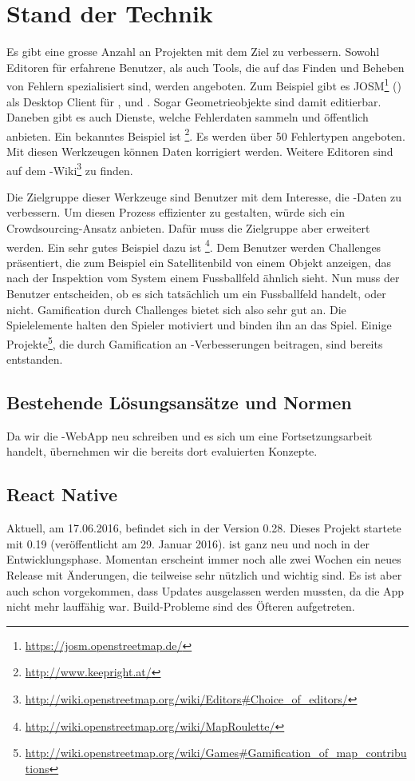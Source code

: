 \chapter{Stand der Technik}
\label{tb-stand-der-technik}
Es gibt eine grosse Anzahl an Projekten mit dem Ziel  zu verbessern.
Sowohl Editoren für erfahrene Benutzer, als auch Tools, die auf das Finden und Beheben von Fehlern spezialisiert sind, werden angeboten.
Zum Beispiel gibt es JOSM\footnote{\url{https://josm.openstreetmap.de/}} () als Desktop Client für ,  und .
Sogar Geometrieobjekte sind damit editierbar.
Daneben gibt es auch Dienste, welche Fehlerdaten sammeln und öffentlich anbieten.
Ein bekanntes Beispiel ist \footnote{\url{http://www.keepright.at/}}.
Es werden über 50 Fehlertypen angeboten.
Mit diesen Werkzeugen können Daten korrigiert werden.
Weitere Editoren sind auf dem -Wiki\footnote{\url{http://wiki.openstreetmap.org/wiki/Editors\#Choice_of_editors/}} zu finden.

Die Zielgruppe dieser Werkzeuge sind Benutzer mit dem Interesse, die -Daten zu verbessern.
Um diesen Prozess effizienter zu gestalten, würde sich ein \gls{Crowdsourcing}-Ansatz anbieten.
Dafür muss die Zielgruppe aber erweitert werden.
Ein sehr gutes Beispiel dazu ist \footnote{\url{http://wiki.openstreetmap.org/wiki/MapRoulette/}}.
Dem Benutzer werden Challenges präsentiert, die zum Beispiel ein Satellitenbild von einem Objekt anzeigen, das nach der Inspektion vom System einem Fussballfeld ähnlich sieht.
Nun muss der Benutzer entscheiden, ob es sich tatsächlich um ein Fussballfeld handelt, oder nicht.
\gls{Gamification} durch Challenges bietet sich also sehr gut an.
Die Spielelemente halten den Spieler motiviert und binden ihn an das Spiel.
Einige Projekte\footnote{\url{http://wiki.openstreetmap.org/wiki/Games\#Gamification_of_map_contributions}}, die durch \gls{Gamification} an -Verbesserungen beitragen, sind bereits entstanden.\cite{ba-kort-2012}

\section{Bestehende Lösungsansätze und Normen}
Da wir die \kort{}-\gls{WebApp} neu schreiben und es sich um eine Fortsetzungsarbeit handelt, übernehmen wir die bereits dort evaluierten Konzepte.


\section{React Native}
Aktuell, am 17.06.2016, befindet sich  in der Version 0.28.
Dieses Projekt startete mit  0.19 (veröffentlicht am 29. Januar 2016).
 ist ganz neu und noch in der Entwicklungsphase.
Momentan erscheint immer noch alle zwei Wochen ein neues Release mit Änderungen, die teilweise sehr nützlich und wichtig sind.
Es ist aber auch schon vorgekommen, dass Updates ausgelassen werden mussten, da die App nicht mehr lauffähig war.
Build-Probleme sind des Öfteren aufgetreten.

